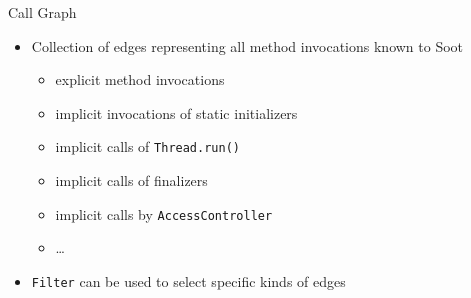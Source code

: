 \newcommand{\comment}[1]{}


\begin{slide}{Call Graph}
\begin{itemize}
\item Collection of edges representing {\red all} method invocations known to Soot
\begin{itemize}
\item explicit method invocations
\item implicit invocations of static initializers
\item implicit calls of {\tt Thread.run()}
\item implicit calls of finalizers
\item implicit calls by {\tt AccessController}
\item \ldots
\end{itemize}
\item {\tt Filter} can be used to select specific kinds of edges
\end{itemize}
\end{slide}

\comment{
\begin{slide}{Updating Call Graph}
\begin{itemize}
\item {\tt addEdge( Edge )}
\item {\tt removeEdge( Edge )}
\item Call graph queries always give up-to-date information
\end{itemize}
\end{slide}
}


